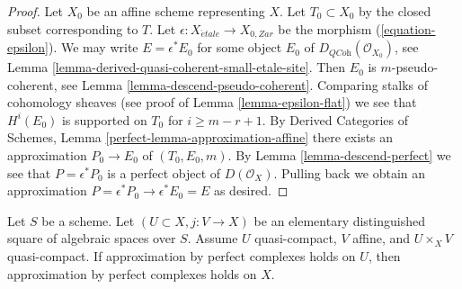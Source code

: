 \begin{proof}
Let $X_0$ be an affine scheme representing $X$. Let $T_0 \subset X_0$
by the closed subset corresponding to $T$. Let
$\epsilon : X_{\acute{e}tale} \to X_{0, Zar}$ be the morphism
(\ref{equation-epsilon}). We may write $E = \epsilon^*E_0$ for some object
$E_0$ of $D_{\textit{QCoh}}(\mathcal{O}_{X_0})$, see
Lemma \ref{lemma-derived-quasi-coherent-small-etale-site}.
Then $E_0$ is $m$-pseudo-coherent, see
Lemma \ref{lemma-descend-pseudo-coherent}.
Comparing stalks of cohomology sheaves (see proof of
Lemma \ref{lemma-epsilon-flat})
we see that $H^i(E_0)$ is supported on $T_0$ for $i \geq m - r + 1$. By
Derived Categories of Schemes, Lemma \ref{perfect-lemma-approximation-affine}
there exists an approximation $P_0 \to E_0$ of
$(T_0, E_0, m)$. By Lemma \ref{lemma-descend-perfect}
we see that $P = \epsilon^*P_0$ is a perfect object of $D(\mathcal{O}_X)$.
Pulling back we obtain an approximation
$P = \epsilon^*P_0 \to \epsilon^*E_0 = E$ as desired.
\end{proof}

\begin{lemma}
\label{lemma-induction-step}
Let $S$ be a scheme. Let $(U \subset X, j : V \to X)$ be an
elementary distinguished square of algebraic spaces over $S$.
Assume $U$ quasi-compact, $V$ affine, and $U \times_X V$ quasi-compact.
If approximation by perfect complexes holds on $U$,
then approximation by perfect complexes holds on $X$.
\end{lemma}

